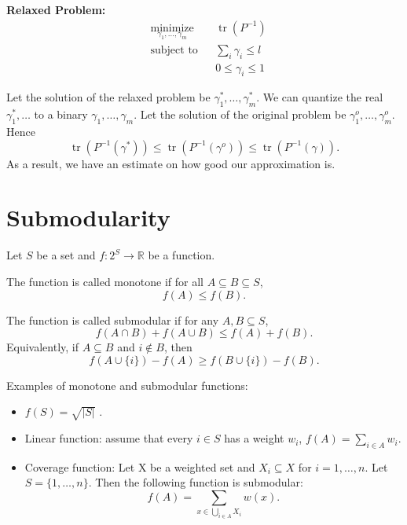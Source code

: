 \documentclass{article}
\DeclareMathOperator*{\tr}{tr}     %
\begin{document}
{\bf Relaxed Problem:}
    \begin{align*}
      &\mathop{\textrm{minimize}}\limits_{\gamma_1,\dots,\gamma_m}&
      & \tr( P^{-1})\nonumber\\
      &\textrm{subject to}&
      & \sum_i \gamma_i\leq l\\
      &&&0\leq \gamma_i \leq 1
    \end{align*}

Let the solution of the relaxed problem be $\gamma_1^*,\dots,\gamma_m^*$. We can quantize the real $\gamma_1^*,\dots$ to a binary $\gamma_1,\dots,\gamma_m$. Let the solution of the original problem be $\gamma_1^o,\dots,\gamma_m^o$. Hence
\begin{displaymath}
  \tr(P^{-1}(\gamma^*)) \leq  \tr(P^{-1}(\gamma^o))\leq  \tr(P^{-1}(\gamma)).
\end{displaymath}
As a result, we have an estimate on how good our approximation is.
\section{Submodularity}
Let $S$ be a set and $f:2^S\rightarrow \mathbb R$ be a function.

The function is called monotone if for all $A\subseteq B\subseteq S$, 
\begin{displaymath}
 f(A) \leq f(B). 
\end{displaymath}

The function is called submodular if for any $A,B\subseteq S$,
\begin{displaymath}
 f(A\cap B)+f(A\cup B)\leq f(A) + f(B). 
\end{displaymath}
Equivalently, if $A\subseteq B$ and $i\notin B$, then
\begin{displaymath}
  f(A\cup \{i\})-f(A)\geq f(B\cup \{i\})-f(B).
\end{displaymath}

Examples of monotone and submodular functions:
\begin{itemize}
  \item $f(S) = \sqrt{|S|}$ .
  \item Linear function: assume that every $i\in S$ has a weight $w_i$, $f(A)  = \sum_{i\in A} w_i$.
  \item Coverage function: Let X be a weighted set and $X_i\subseteq X$ for $i=1,\dots,n$. Let $S = \{1,\dots,n\}$. Then the following function is submodular:
    \begin{displaymath}
      f(A) = \sum_{x\in \bigcup_{i\in A}X_i } w(x).
    \end{displaymath}
\end{itemize}
\end{document}
